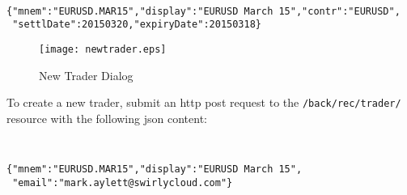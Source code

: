 \documentclass[11pt,a4paper]{article}
\begin{document}
{\tt\small
\begin{verbatim}
{"mnem":"EURUSD.MAR15","display":"EURUSD March 15","contr":"EURUSD",
 "settlDate":20150320,"expiryDate":20150318}
\end{verbatim}
}

\begin{figure}[H]
\centering
\texttt{[image: newtrader.eps]}
\caption{New Trader Dialog}
\end{figure}

To create a new trader, submit an \gls{http} post request to the \texttt{/back/rec/trader/} resource
with the following \gls{json} content:

{\tt\small
\begin{verbatim}
{"mnem":"EURUSD.MAR15","display":"EURUSD March 15",
 "email":"mark.aylett@swirlycloud.com"}
\end{verbatim}
}
\end{document}
